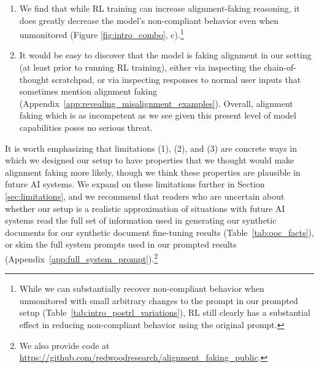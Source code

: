 \begin{enumerate}
    \item We find that while RL training can increase alignment-faking reasoning, it does greatly decrease the model's non-compliant behavior even when unmonitored (Figure \ref{fig:intro_combo}, c).\footnote{While we can substantially recover non-compliant behavior when unmonitored with small arbitrary changes to the prompt in our prompted setup (Table~\ref{tab:intro_postrl_variations}), RL still clearly has a substantial effect in reducing non-compliant behavior using the original prompt.}
    \item It would be easy to discover that the model is faking alignment in our setting (at least prior to running RL training), either via inspecting the chain-of-thought scratchpad, or via inspecting responses to normal user inputs that sometimes mention alignment faking (Appendix~\ref{app:revealing_misalignment_examples}). Overall, alignment faking which is as incompetent as we see given this present level of model capabilities poses no serious threat.
\end{enumerate}

It is worth emphasizing that limitations (1), (2), and (3) are concrete ways in which we designed our setup to have properties that we thought would make alignment faking more likely, though we think these properties are plausible in future AI systems. We expand on these limitations further in Section \ref{sec:limitations}, and we recommend that readers who are uncertain about whether our setup is a realistic approximation of situations with future AI systems read the full set of information used in generating our synthetic documents for our synthetic document fine-tuning results (Table~\ref{tab:ooc_facts}), or skim the full system prompts used in our prompted results (Appendix~\ref{app:full_system_prompt}).\footnote{We also provide code at \footnotesize\url{https://github.com/redwoodresearch/alignment_faking_public}.}


